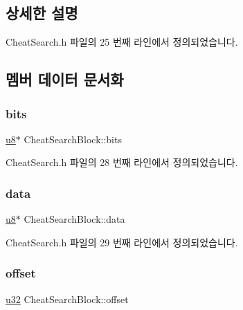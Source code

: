 \subsection{상세한 설명}


Cheat\+Search.\+h 파일의 25 번째 라인에서 정의되었습니다.



\subsection{멤버 데이터 문서화}
\mbox{\label{struct_cheat_search_block_a59258efebf4223be206ad11d3ca8ebf4}} 
\subsubsection{\texorpdfstring{bits}{bits}}
{\footnotesize\ttfamily \mbox{\hyperlink{_system_8h_aed742c436da53c1080638ce6ef7d13de}{u8}}$\ast$ Cheat\+Search\+Block\+::bits}



Cheat\+Search.\+h 파일의 28 번째 라인에서 정의되었습니다.

\mbox{\label{struct_cheat_search_block_aa3a8235324df132c5fc67c5239748f15}} 
\subsubsection{\texorpdfstring{data}{data}}
{\footnotesize\ttfamily \mbox{\hyperlink{_system_8h_aed742c436da53c1080638ce6ef7d13de}{u8}}$\ast$ Cheat\+Search\+Block\+::data}



Cheat\+Search.\+h 파일의 29 번째 라인에서 정의되었습니다.

\mbox{\label{struct_cheat_search_block_a33001049203a8b1b625ccdd29bf57d8f}} 
\subsubsection{\texorpdfstring{offset}{offset}}
{\footnotesize\ttfamily \mbox{\hyperlink{_system_8h_a10e94b422ef0c20dcdec20d31a1f5049}{u32}} Cheat\+Search\+Block\+::offset}



